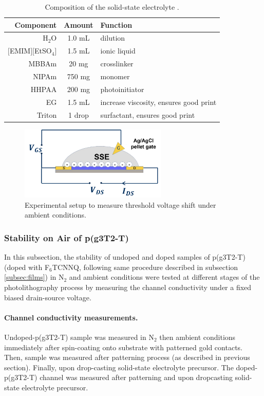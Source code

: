 \begin{table}[h]
	\centering
	\caption{Composition of the solid-state electrolyte \cite{weissbachPhotopatternableSolidElectrolyte2022}.}
	\begin{tabular}{r c l} \hline
		Component   & Amount & Function \\ \hline
		H$_{2}$O	& 1.0 mL & dilution \\ 
		$[$EMIM$][$EtSO$_{4}]$   & 1.5 mL & ionic liquid \\ 
		MBBAm   & 20 mg & crosslinker \\ 
		NIPAm   & 750 mg & monomer \\ 
		HHPAA   & 200 mg & photoinitiator \\
		EG	& 1.5 mL	& increase viscosity, ensures good print \\ 
		Triton & 1 drop & surfactant, ensures good print \\  \hline
	\end{tabular}
	\label{tab:sse}
\end{table}

\begin{figure}[!ht]
	\centering
	\includegraphics[width=7cm]{Images/pdf/bioprobe_setup.pdf}
	\caption{Experimental setup to measure threshold voltage shift under ambient conditions.}
	\label{fig:biosetup}
\end{figure}

\subsubsection{Stability on Air of p(g3T2-T)}
In this subsection, the stability of undoped and doped samples of p(g3T2-T) (doped with F$_{6}$TCNNQ, following same procedure described in subsection \ref{subsec:films}) in N$_{2}$ and ambient conditions were tested at different stages of the photolithography process by measuring the channel conductivity under a fixed biased drain-source voltage. %

\paragraph{Channel conductivity measurements.}Undoped-p(g3T2-T) sample was measured in N$_{2}$ then ambient conditions immediately after spin-coating onto substrate with patterned gold contacts. Then, sample was measured after patterning process (as described in previous section). Finally, upon drop-casting solid-state electrolyte precursor. The doped-p(g3T2-T) channel was measured after patterning and upon dropcasting solid-state electrolyte precursor.

